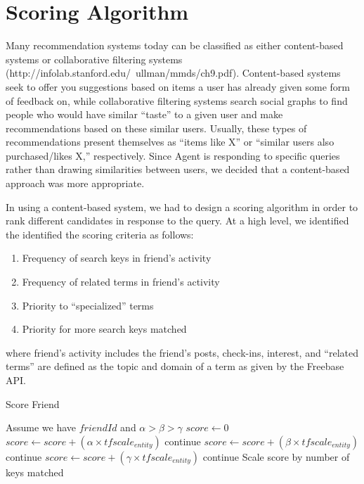 

\section{Scoring Algorithm}
\label{sec:scoring}

Many recommendation systems today can be classified as either content-based
systems or collaborative filtering systems
(http://infolab.stanford.edu/~ullman/mmds/ch9.pdf). Content-based systems seek
to offer you suggestions based on items a user has already given some form of
feedback on, while collaborative filtering systems search social graphs to find
people who would have similar ``taste'' to a given user and make recommendations
based on these similar users. Usually, these types of recommendations present
themselves as ``items like X'' or ``similar users also purchased/likes X,''
respectively. Since Agent is responding to specific queries rather than drawing
similarities between users, we decided that a content-based approach was more
appropriate.

In using a content-based system, we had to design a scoring algorithm in order
to rank different candidates in response to the query. At a high level, we
identified the identified the scoring criteria as follows:
\begin{enumerate}
\item Frequency of search keys in friend's activity
\item Frequency of related terms in friend's activity
\item Priority to ``specialized'' terms
\item Priority for more search keys matched
\end{enumerate}
where friend's activity includes the friend's posts, check-ins, interest,
and ``related terms'' are defined as the topic and domain of a term as given by the Freebase API.


\begin{algorithm}
\caption{Score Friend}
\begin{algorithmic}
\STATE Assume we have $friendId$ and $\alpha > \beta > \gamma$
\STATE $score \gets 0$
      \STATE $score \gets score + (\alpha \times tfscale_{entity})$
      \STATE continue
    \ENDIF
      \STATE $score \gets score + (\beta \times tfscale_{entity})$
      \STATE  continue
    \ENDIF
      \STATE $score \gets score + (\gamma \times tfscale_{entity})$
      \STATE  continue
    \ENDIF
\ENDFOR
\ENDFOR
\STATE Scale score by number of keys matched
\end{algorithmic}
\end{algorithm}

